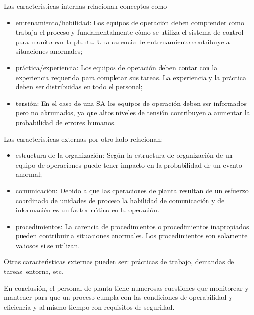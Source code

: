 Las caracter{\'\i}sticas internas relacionan conceptos como
\begin{itemize}
    \item entrenamiento/habilidad: Los equipos de operaci{\'o}n deben comprender c{\'o}mo trabaja el proceso y
    fundamentalmente c{\'o}mo se utiliza el sistema de control para monitorear la planta. Una carencia de
    entrenamiento contribuye a situaciones anormales;
    \item pr{\'a}ctica/experiencia: Los equipos de operaci{\'o}n deben contar con la experiencia requerida para
    completar sus tareas. La experiencia y la pr{\'a}ctica deben ser distribuidas en todo el personal;
    \item tensi{\'o}n: En el caso de una SA los equipos de operaci{\'o}n deben ser informados pero no abrumados, ya
    que altos niveles de tensi{\'o}n contribuyen a aumentar la probabilidad de errores humanos.
\end{itemize}

Las caracter{\'\i}sticas externas por otro lado relacionan:
\begin{itemize}
    \item estructura de la organizaci{\'o}n: Seg{\'u}n la estructura de organizaci{\'o}n de un equipo de operaciones
    puede tener impacto en la probabilidad de un evento anormal;
    \item comunicaci{\'o}n: Debido a que las operaciones de planta resultan de un esfuerzo coordinado de
    unidades de proceso la habilidad de comunicaci{\'o}n y de informaci{\'o}n es un factor cr{\'\i}tico en la operaci{\'o}n.
    \item procedimientos: La carencia de procedimientos o procedimientos inapropiados pueden contribuir a
    situaciones anormales. Los procedimientos son solamente valiosos si se utilizan.
\end{itemize}

Otras caracter{\'\i}sticas externas pueden ser: pr{\'a}cticas de trabajo, demandas de tareas, entorno, etc.

En conclusi{\'o}n, el personal de planta tiene numerosas cuestiones que monitorear y mantener para que un
proceso cumpla con las condiciones de operabilidad y eficiencia y al mismo tiempo con requisitos de
seguridad.

